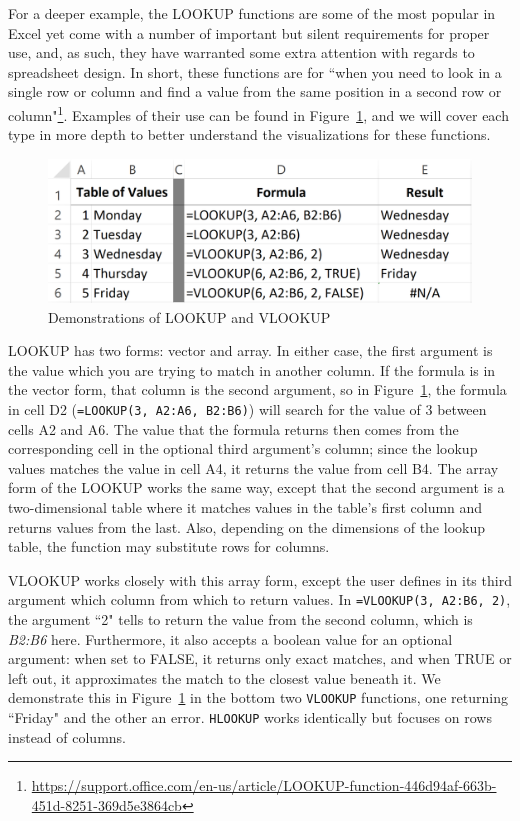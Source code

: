 \documentclass[conference]{IEEEtran}
\begin{document}
	For a deeper example, the LOOKUP functions are some of the most popular in
	Excel yet come with a number of important but silent requirements for proper
	use, and, as such, they have warranted some extra attention with regards to
	spreadsheet design. In short, these functions are for ``when you need to look
	in a single row or column and find a value from the same position in a second
	row or
	column"\footnote{\url{https://support.office.com/en-us/article/LOOKUP-function-446d94af-663b-451d-8251-369d5e3864cb}}. Examples of their use can be found in Figure~\ref{fig:lookupexample}, and we will cover each type in more depth to better understand the visualizations for these functions.
	
	\begin{figure}[h] \centering
		\includegraphics[width=.5\textwidth]{lookupexample} \caption{Demonstrations of
			LOOKUP and VLOOKUP} \label{fig:lookupexample} \end{figure}
	
	LOOKUP has two forms: vector and array. In either case, the first argument is
	the value which you are trying to match in another column. If the formula is in
	the vector form, that column is the second argument, so in
	Figure~\ref{fig:lookupexample}, the formula in cell D2 (\texttt{=LOOKUP(3,
		A2:A6, B2:B6)}) will search for the value of 3 between cells A2 and A6. The
	value that the formula returns then comes from the corresponding cell in the
	optional third argument's column; since the lookup values matches the value in
	cell A4, it returns the value from cell B4. The array form of the LOOKUP works
	the same way, except that the second argument is a two-dimensional table where
	it matches values in the table's first column and returns values from the last.
	Also, depending on the dimensions of the lookup table, the function may
	substitute rows for columns.
	
	VLOOKUP works closely with this array form, except the user defines in its
	third argument which column from which to return values. In \texttt{=VLOOKUP(3,
		A2:B6, 2)}, the argument ``2" tells to return the value from the second column,
	which is \textit{B2:B6} here. Furthermore, it also accepts a boolean value for
	an optional argument: when set to FALSE, it returns only exact matches, and
	when TRUE or left out, it approximates the match to the closest value beneath
	it. We demonstrate this in Figure~\ref{fig:lookupexample} in the bottom two
	\texttt{VLOOKUP} functions, one returning ``Friday" and the other an error. \texttt{HLOOKUP}
	works identically but focuses on rows instead of columns.
	
\end{document}
